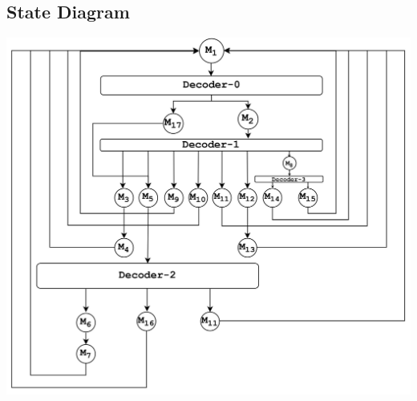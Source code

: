 \documentclass{article}
\begin{document}
\subsection{State Diagram}
      \begin{center}
          \includegraphics[width = 1.02\linewidth]{Images/fsm.jpg}
      \end{center}
\end{document}
